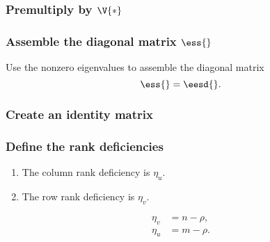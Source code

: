 \subsubsection{Premultiply by $\V{*}$}
\subsubsection{Assemble the diagonal matrix $\ess{}$} 
Use the nonzero eigenvalues to assemble the diagonal matrix
\begin{equation}
  \ess{} = \eesd{}.
\end{equation}
{} 
\subsubsection{Create an identity matrix}
\subsubsection{Define the rank deficiencies}
%
\begin{enumerate}
\item The column rank deficiency is $\eta_{u}$.
\item The row rank deficiency is $\eta_{v}$.
\end{enumerate}
%
\begin{equation}
  \begin{split}
     \eta_{v} &= n - \rho,\\
     \eta_{u} &= m - \rho.
  \end{split}
\end{equation}
{} 

